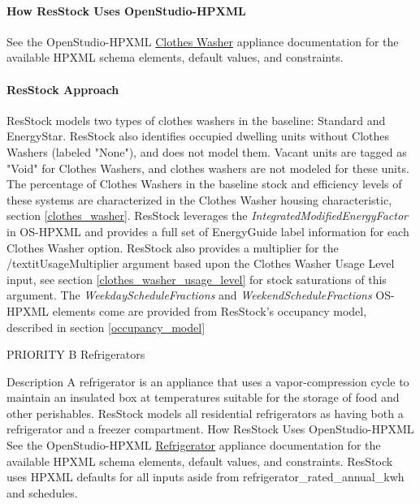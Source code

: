 \paragraph{How ResStock Uses OpenStudio-HPXML}

See the OpenStudio-HPXML \href{https://openstudio-hpxml.readthedocs.io/en/v1.8.1/workflow_inputs.html#hpxml-clothes-washer}{Clothes Washer} appliance documentation for the available HPXML schema elements, default values, and constraints. 

\paragraph{ResStock Approach}

ResStock models two types of clothes washers in the baseline: Standard and EnergyStar. ResStock also identifies occupied dwelling units without Clothes Washers (labeled "None"), and does not model them. Vacant units are tagged as "Void" for Clothes Washers, and clothes washers are not modeled for these units. The percentage of Clothes Washers in the baseline stock and efficiency levels of these systems are characterized in the Clothes Washer housing characteristic, section \ref{clothes_washer}. ResStock leverages the \textit{IntegratedModifiedEnergyFactor} in OS-HPXML and provides a full set of EnergyGuide label information for each Clothes Washer option. ResStock also provides a multiplier for the /textit{UsageMultiplier} argument based upon the Clothes Washer Usage Level input, see section \ref{clothes_washer_usage_level} for stock saturations of this argument. The \textit{WeekdayScheduleFractions} and \textit{WeekendScheduleFractions} OS-HPXML elements come are provided from ResStock's occupancy model, described in section \ref{occupancy_model} 

    \item	PRIORITY B Refrigerators

    {Description}
A refrigerator is an appliance that uses a vapor-compression cycle to maintain an insulated box at temperatures suitable for the storage of food and other perishables. ResStock models all residential refrigerators as having both a refrigerator and a freezer compartment. 
    {How ResStock Uses OpenStudio-HPXML}
See the OpenStudio-HPXML \href{https://openstudio-hpxml.readthedocs.io/en/v1.8.1/workflow_inputs.html#hpxml-refrigerators}{Refrigerator} appliance documentation for the available HPXML schema elements, default values, and constraints.  ResStock uses HPXML defaults for all inputs aside from refrigerator\_rated\_annual\_kwh and schedules. 

